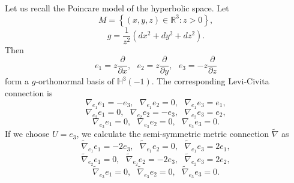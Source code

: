 \documentclass{amsart}
\theoremstyle{plain}
\theoremstyle{definition}
\theoremstyle{remark}
\numberwithin{equation}{section}
\begin{document}
Let us recall the Poincare model of the hyperbolic space. Let 
\begin{equation*}
M=\left\{ \left( x,y,z\right) \in \mathbb{R}^{3}:z>0\right\} ,
\end{equation*}%
\begin{equation*}
g=\frac{1}{z^{2}}\left( dx^{2}+dy^{2}+dz^{2}\right) .
\end{equation*}%
Then 
\begin{equation*}
e_{1}=z\frac{\partial }{\partial x},\text{ }e_{2}=z\frac{\partial }{\partial
y},\text{ }e_{3}=-z\frac{\partial }{\partial z}
\end{equation*}%
form a $g$-orthonormal basis of $\mathbb{H}^{3}(-1)$. The corresponding
Levi-Civita connection is%
\begin{equation*}
\nabla _{e_{1}}e_{1}=-e_{3},\text{ }\nabla _{e_{1}}e_{2}=0,\text{ }\nabla
_{e_{1}}e_{3}=e_{1},
\end{equation*}%
\begin{equation*}
\nabla _{e_{2}}e_{1}=0,\text{ }\nabla _{e_{2}}e_{2}=-e_{3},\text{ }\nabla
_{e_{2}}e_{3}=e_{2},
\end{equation*}%
\begin{equation*}
\nabla _{e_{3}}e_{1}=0,\text{ }\nabla _{e_{3}}e_{2}=0,\text{ }\nabla
_{e_{3}}e_{3}=0.
\end{equation*}%
If we choose $U=e_{3}$, we calculate the semi-symmetric metric connection $%
\widetilde{\nabla }$ as%
\begin{equation*}
\widetilde{\nabla }_{e_{1}}e_{1}=-2e_{3},\text{ }\widetilde{\nabla }%
_{e_{1}}e_{2}=0,\text{ }\widetilde{\nabla }_{e_{1}}e_{3}=2e_{1},
\end{equation*}%
\begin{equation*}
\widetilde{\nabla }_{e_{2}}e_{1}=0,\text{ }\widetilde{\nabla }%
_{e_{2}}e_{2}=-2e_{3},\text{ }\widetilde{\nabla }_{e_{2}}e_{3}=2e_{2},
\end{equation*}%
\begin{equation*}
\widetilde{\nabla }_{e_{3}}e_{1}=0,\text{ }\widetilde{\nabla }%
_{e_{3}}e_{2}=0,\text{ }\widetilde{\nabla }_{e_{3}}e_{3}=0.
\end{equation*}
\end{document}
